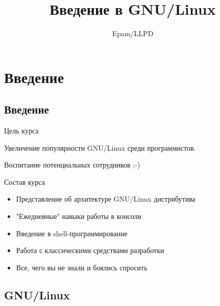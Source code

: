 \documentclass[ignorenonframetext, professionalfonts, hyperref={pdftex, unicode}]{beamer}
\title{Введение в GNU/Linux}
\author{Epam/LLPD}
\begin{document}
\section{Введение}


\frame{
	\frametitle{}
	\titlepage
	\vspace{-0.5cm}
	\begin{center}
	\end{center}
}
\frame{
	\tableofcontents[hideallsubsections]
}















\subsection{Введение}

\begin{frame}{Цель курса}
	\begin{center}
		\Huge
		Увеличение популярности GNU/Linux среди программистов.

		\hrulefill

		\normalsize
		Воспитание потенциальных сотрудников ;-)
	\end{center}
\end{frame}


\begin{frame}{Состав курса}
	\begin{itemize}
		\item Представление об архитектуре GNU/Linux дистрибутива
			\pause
		\item "Ежедневные" навыки работы в консоли
			\pause
		\item Введение в shell-программирование
			\pause
		\item Работа с классическими средствами разработки
			\pause
		\item Все, чего вы не знали и боялись спросить
	\end{itemize}
\end{frame}




\subsection{GNU/Linux}
\end{document}
